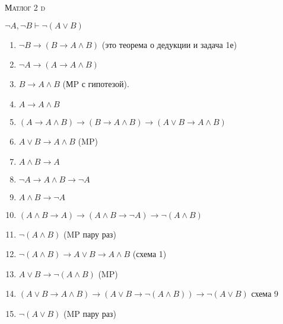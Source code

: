 \documentclass[10pt]{article}
\theoremstyle{definition}
\begin{document}
\def\chap#1#2{\ \\ {\large\bf#1 \ | \ \tt\scshape#2} \par}

\ \vspace{-1cm}

{\bf
\ \\
\Large\centerline{\scshape Матлог 2 d}
}\normalsize

$\neg A, \neg B \vdash \neg(A \lor B)$
\begin{enumerate}
    \item $\neg B \to (B \to A \land B)$ (это теорема о дедукции и задача 1е)
    \item $\neg A \to (A \to A \land B)$
    \item $B \to A \land B$ (МP с гипотезой).
    \item $A \to A \land B$
    \item $(A \to A \land B) \to (B \to A \land B) \to (A \lor B \to A \land B)$
    \item $A \lor B \to A \land B$ (MP) 
    \item $A \land B \to A$ 
    \item $\neg A \to A \land B \to \neg A$
    \item $A \land B \to \neg A$
    \item $(A \land B \to A) \to (A \land B \to  \neg A) \to \neg (A \land B)$
    \item $\neg (A \land B)$ (MP пару раз)
    \item $\neg (A \land B) \to A \lor B \to A \land B$ (схема 1)
    \item $A \lor B \to \neg (A \land B)$ (MP)
    \item $(A \lor B \to A \land B) \to (A \lor B \to \neg (A \land B)) \to \neg (A \lor B)$ схема 9
    \item $\neg (A \lor B)$ (MP пару раз) 
\end{enumerate}

\end{document}
